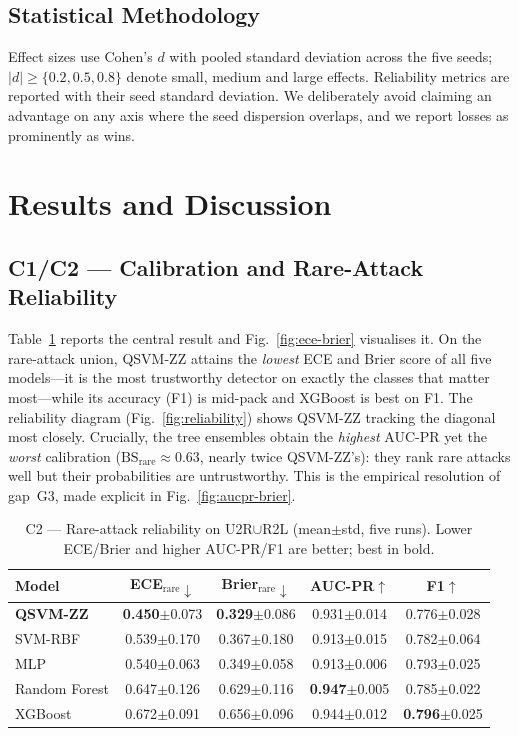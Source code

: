 \documentclass[journal]{IEEEtran}
\newcommand{\ZZ}{\textsc{ZZ}}
\newcommand{\QSVM}{QSVM-\ZZ}
\newcommand{\Brier}{\mathrm{BS}}
\begin{document}
\subsection{Statistical Methodology}
Effect sizes use Cohen's $d$ with pooled standard deviation across the
five seeds; $|d|\ge\{0.2,0.5,0.8\}$ denote small, medium and large
effects. Reliability metrics are reported with their seed standard
deviation. We deliberately avoid claiming an advantage on any axis where
the seed dispersion overlaps, and we report losses as prominently as
wins.

\section{Results and Discussion}\label{sec:results}

\subsection{C1/C2 --- Calibration and Rare-Attack Reliability}
Table~\ref{tab:rare} reports the central result and
Fig.~\ref{fig:ece-brier} visualises it. On the rare-attack union,
\QSVM{} attains the \emph{lowest} ECE and Brier score of all five
models---it is the most trustworthy detector on exactly the classes that
matter most---while its accuracy (F1) is mid-pack and XGBoost is best on
F1. The reliability diagram (Fig.~\ref{fig:reliability}) shows \QSVM{}
tracking the diagonal most closely. Crucially, the tree ensembles obtain
the \emph{highest} AUC-PR yet the \emph{worst} calibration
($\Brier_{\text{rare}}\!\approx\!0.63$, nearly twice \QSVM{}'s): they
rank rare attacks well but their probabilities are untrustworthy. This is
the empirical resolution of gap~G3, made explicit in
Fig.~\ref{fig:aucpr-brier}.

\begin{table}[t]
\centering
\caption{C2 --- Rare-attack reliability on U2R$\cup$R2L
  (mean$\pm$std, five runs). Lower ECE/Brier and higher AUC-PR/F1 are
  better; best in bold.}
\label{tab:rare}
\small
\begin{tabular}{lcccc}
\toprule
Model & ECE$_{\text{rare}}\!\downarrow$ & Brier$_{\text{rare}}\!\downarrow$ & AUC-PR$\uparrow$ & F1$\uparrow$\\\midrule
\textbf{\QSVM{}}     & \textbf{0.450}$\pm$0.073 & \textbf{0.329}$\pm$0.086 & 0.931$\pm$0.014 & 0.776$\pm$0.028\\
SVM-RBF              & 0.539$\pm$0.170 & 0.367$\pm$0.180 & 0.913$\pm$0.015 & 0.782$\pm$0.064\\
MLP                  & 0.540$\pm$0.063 & 0.349$\pm$0.058 & 0.913$\pm$0.006 & 0.793$\pm$0.025\\
Random Forest        & 0.647$\pm$0.126 & 0.629$\pm$0.116 & \textbf{0.947}$\pm$0.005 & 0.785$\pm$0.022\\
XGBoost              & 0.672$\pm$0.091 & 0.656$\pm$0.096 & 0.944$\pm$0.012 & \textbf{0.796}$\pm$0.025\\
\bottomrule
\end{tabular}
\end{table}
\end{document}
